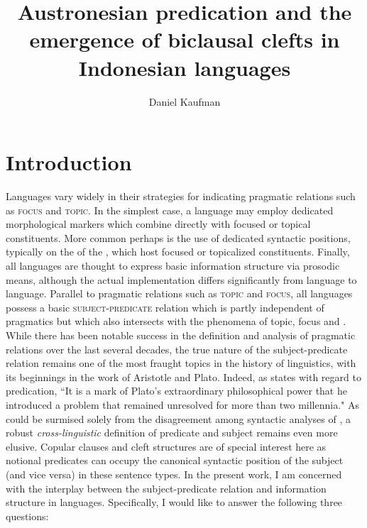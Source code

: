 \documentclass[output=paper]{langsci/langscibook}
\title{Austronesian predication and the emergence of biclausal clefts in Indonesian languages}
\author{Daniel Kaufman\affiliation{Queens College \& ELA}}
\begin{document}
\maketitle

\section{\label{s:kaufman:1}Introduction}

Languages vary widely in their strategies for indicating pragmatic relations such as \textsc{focus} and  \textsc{topic}. In the simplest case, a language may employ dedicated morphological markers which combine directly with focused or topical constituents. More common perhaps is the use of dedicated syntactic positions, typically on the  of the , which host focused or topicalized constituents. Finally, all languages are thought to express basic information structure via prosodic means, although the actual implementation differs significantly from language to language. Parallel to pragmatic relations such as \textsc{topic} and \textsc{focus}, all languages possess a basic \textsc{subject-predicate} relation which is partly independent of pragmatics but which also intersects with the phenomena of topic, focus and . While there has been notable success in the definition and analysis of pragmatic relations over the last several decades, the true nature of the subject-predicate relation remains one of the most fraught topics in the history of linguistics, with its beginnings in the work of Aristotle and Plato. Indeed, as \citet[83]{Davidson:2005} states with regard to predication, ``It is a mark of Plato’s extraordinary philosophical power that he introduced a problem that remained unresolved for more than two millennia." As could be surmised solely from the disagreement among syntactic analyses of , a robust \emph{cross-linguistic} definition of predicate and subject remains even more elusive. Copular clauses and cleft structures are of special interest here as notional predicates can occupy the canonical syntactic position of the subject (and vice versa) in these sentence types. In the present work, I am concerned with the interplay between the subject-predicate relation and information structure in  languages. Specifically, I would like to answer the following three questions: 
\end{document}
